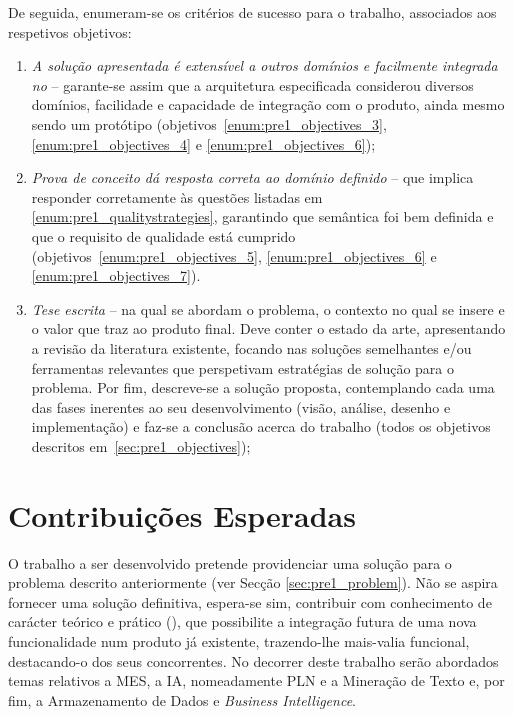 De seguida, enumeram-se os critérios de sucesso para o trabalho, associados aos respetivos objetivos:

\begin{enumerate}
    \item
    {
        \textit{A solução apresentada é extensível a outros domínios e facilmente integrada no {\productname}} -- garante-se assim que a arquitetura especificada considerou diversos domínios, facilidade e capacidade de integração com o produto, ainda mesmo sendo um protótipo (objetivos~\ref{enum:pre1_objectives_3}, \ref{enum:pre1_objectives_4} e \ref{enum:pre1_objectives_6});
    }
    \item
    {
        \textit{Prova de conceito dá resposta correta ao domínio definido} -- que implica responder corretamente às questões listadas em \ref{enum:pre1_qualitystrategies}, garantindo que semântica foi bem definida e que o requisito de qualidade está cumprido (objetivos~\ref{enum:pre1_objectives_5}, \ref{enum:pre1_objectives_6} e \ref{enum:pre1_objectives_7}).
    }
    \item 
    {
        \textit{Tese escrita} -- na qual se abordam o problema, o contexto no qual se insere e o valor que traz ao produto final. Deve conter o estado da arte, apresentando a revisão da literatura existente, focando nas soluções semelhantes e/ou ferramentas relevantes que perspetivam estratégias de solução para o problema. Por fim, descreve-se a solução proposta, contemplando cada uma das fases inerentes ao seu desenvolvimento (visão, análise, desenho e implementação) e faz-se a conclusão acerca do trabalho (todos os objetivos descritos em~\ref{sec:pre1_objectives});
    }
\end{enumerate}

\chapter{Contribuições Esperadas}
\label{chap:pre2}

O trabalho a ser desenvolvido pretende providenciar uma solução para o problema descrito anteriormente (ver Secção \ref{sec:pre1_problem}). Não se aspira fornecer uma solução definitiva, espera-se sim, contribuir com conhecimento de carácter teórico e prático (), que possibilite a integração futura de uma nova funcionalidade num produto já existente, trazendo-lhe mais-valia funcional, destacando-o dos seus concorrentes. No decorrer deste trabalho serão abordados temas relativos a \gls{MES}, a \gls{IA}, nomeadamente \gls{PLN} e a Mineração de Texto e, por fim, a Armazenamento de Dados e \textit{Business Intelligence}. 

